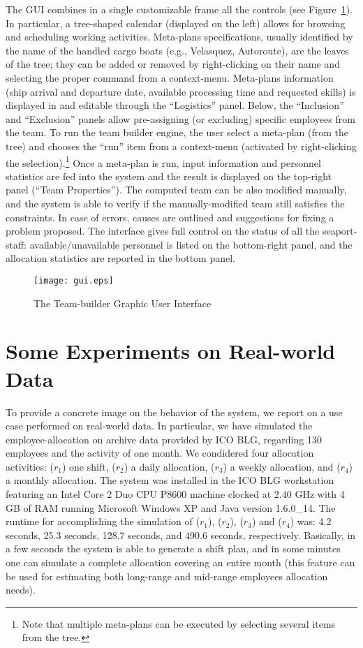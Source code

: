\documentclass{tlp}
\begin{document}
The GUI combines in a single customizable
frame all the  controls  (see Figure~\ref{fig:gui}). In particular,
a tree-shaped calendar (displayed on the left)
allows for browsing and scheduling working activities.
Meta-plans specifications, usually identified by the name of the
handled cargo boats (e.g., Velasquez, Autoroute),
are the leaves of the tree; they can be added or removed by right-clicking on their name
and selecting the proper command from a context-menu.
Meta-plans information (ship arrival and departure date, available processing time
and requested skills) is displayed in and editable through the ``Logistics'' panel.
Below, the ``Inclusion'' and ``Exclusion'' panels allow pre-assigning (or excluding)
specific employees from the team.
To run the team builder engine,
the user select a meta-plan (from the tree) and chooses the ``run''
item from a context-menu (activated by right-clicking the selection).\footnote{Note that multiple meta-plans can be executed by selecting several items from the tree.}
Once a meta-plan is run, input information and personnel statistics are fed into the \dlv system
and the result is displayed on the top-right panel (``Team Properties'').
The computed team can be also modified manually, and
the system is able to verify if the manually-modified team still satisfies
the constraints. In case of errors, causes are outlined and
suggestions for fixing a problem proposed.
The interface gives full control on the status of all the seaport-staff:
available/unavailable personnel is listed on the bottom-right panel,
and the allocation statistics are reported in the bottom panel.

\begin{figure}[t!]
\centering
\texttt{[image: gui.eps]}
\vspace{0.5cm}
\caption{ The Team-builder Graphic User Interface}\label{fig:gui}
\end{figure}


\section{Some Experiments on Real-world Data}\label{sec:exp}

To provide a concrete image on the behavior of the system, we report on
a use case performed on real-world data.
In particular, we have simulated the employee-allocation on archive data provided by ICO BLG,
regarding 130 employees  and the activity of one month. We condidered four allocation activities:
($r_1$) one shift,
($r_2$) a daily allocation,
($r_3$) a weekly allocation, and
($r_4$) a monthly allocation.
The system was installed in the ICO BLG workstation featuring an
Intel Core 2 Duo CPU P8600 machine clocked at 2.40 GHz
with 4 GB of RAM running Microsoft Windows XP and Java version 1.6.0\_14.
The runtime for accomplishing the simulation of ($r_1$), ($r_2$), ($r_3$) and ($r_4$) was:
4.2 seconds, 25.3 seconds, 128.7 seconds, and 490.6 seconds, respectively.
Basically, in a few seconds the system is able to generate a shift plan,
and in some minutes one can simulate a complete allocation covering an entire month
(this feature can be used for estimating both long-range and mid-range
employees allocation needs).
\end{document}
